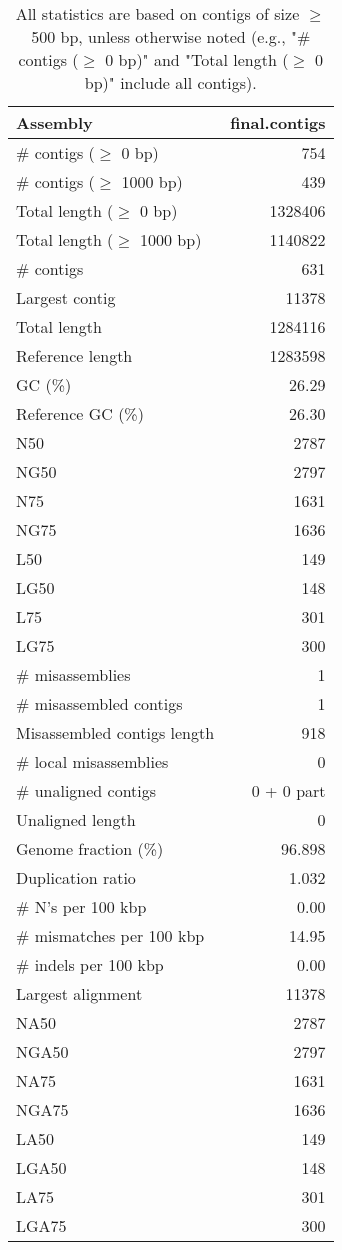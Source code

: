 \documentclass[12pt,a4paper]{article}
\begin{document}
\begin{table}[ht]
\begin{center}
\caption{All statistics are based on contigs of size $\geq$ 500 bp, unless otherwise noted (e.g., "\# contigs ($\geq$ 0 bp)" and "Total length ($\geq$ 0 bp)" include all contigs).}
\begin{tabular}{|l*{1}{|r}|}
\hline
Assembly & final.contigs \\ \hline
\# contigs ($\geq$ 0 bp) & 754 \\ \hline
\# contigs ($\geq$ 1000 bp) & 439 \\ \hline
Total length ($\geq$ 0 bp) & 1328406 \\ \hline
Total length ($\geq$ 1000 bp) & 1140822 \\ \hline
\# contigs & 631 \\ \hline
Largest contig & 11378 \\ \hline
Total length & 1284116 \\ \hline
Reference length & 1283598 \\ \hline
GC (\%) & 26.29 \\ \hline
Reference GC (\%) & 26.30 \\ \hline
N50 & 2787 \\ \hline
NG50 & 2797 \\ \hline
N75 & 1631 \\ \hline
NG75 & 1636 \\ \hline
L50 & 149 \\ \hline
LG50 & 148 \\ \hline
L75 & 301 \\ \hline
LG75 & 300 \\ \hline
\# misassemblies & 1 \\ \hline
\# misassembled contigs & 1 \\ \hline
Misassembled contigs length & 918 \\ \hline
\# local misassemblies & 0 \\ \hline
\# unaligned contigs & 0 + 0 part \\ \hline
Unaligned length & 0 \\ \hline
Genome fraction (\%) & 96.898 \\ \hline
Duplication ratio & 1.032 \\ \hline
\# N's per 100 kbp & 0.00 \\ \hline
\# mismatches per 100 kbp & 14.95 \\ \hline
\# indels per 100 kbp & 0.00 \\ \hline
Largest alignment & 11378 \\ \hline
NA50 & 2787 \\ \hline
NGA50 & 2797 \\ \hline
NA75 & 1631 \\ \hline
NGA75 & 1636 \\ \hline
LA50 & 149 \\ \hline
LGA50 & 148 \\ \hline
LA75 & 301 \\ \hline
LGA75 & 300 \\ \hline
\end{tabular}
\end{center}
\end{table}
\end{document}
